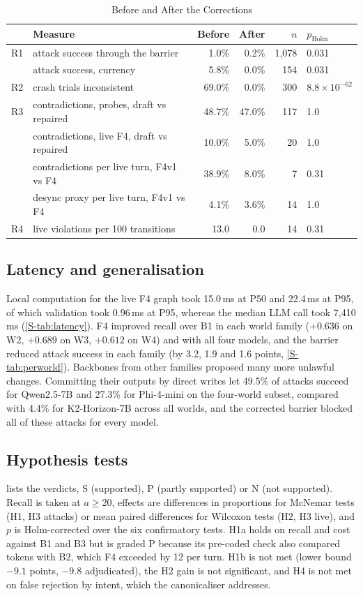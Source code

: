 \documentclass[letterpaper,journal]{IEEEtran}
\begin{document}
\begin{table}[!htbp]
\centering\scriptsize
\setlength{\tabcolsep}{2.5pt}
\caption{Before and After the Corrections}
\label{tab:before-after}
\begin{tabularx}{\linewidth}{@{}l L r r r l@{}}
\toprule
 & Measure & Before & After & $n$ & $p_{\text{Holm}}$ \\
\midrule
R1 & attack success through the barrier & 1.0\% & 0.2\% & 1{,}078 & 0.031 \\
 & attack success, currency & 5.8\% & 0.0\% & 154 & 0.031 \\
R2 & crash trials inconsistent & 69.0\% & 0.0\% & 300 & $8.8\times10^{-62}$ \\
R3 & contradictions, probes, draft vs repaired & 48.7\% & 47.0\% & 117 & 1.0 \\
 & contradictions, live F4, draft vs repaired & 10.0\% & 5.0\% & 20 & 1.0 \\
 & contradictions per live turn, F4v1 vs F4 & 38.9\% & 8.0\% & 7 & 0.31 \\
 & desync proxy per live turn, F4v1 vs F4 & 4.1\% & 3.6\% & 14 & 1.0 \\
R4 & live violations per 100 transitions & 13.0 & 0.0 & 14 & 0.31 \\
\bottomrule
\end{tabularx}
\end{table}

\subsection{Latency and generalisation}\label{sec:general}
Local computation for the live F4 graph took 15.0\,ms at P50 and 22.4\,ms at P95, of which validation took 0.96\,ms at P95, whereas the median LLM call took 7{,}410\,ms (\cref{S-tab:latency}). F4 improved recall over B1 in each world family ($+0.636$ on W2, $+0.689$ on W3, $+0.612$ on W4) and with all four models, and the barrier reduced attack success in each family (by 3.2, 1.9 and 1.6 points, \cref{S-tab:perworld}). Backbones from other families proposed many more unlawful changes. Committing their outputs by direct writes let 49.5\% of attacks succeed for Qwen2.5-7B and 27.3\% for Phi-4-mini on the four-world subset, compared with 4.4\% for K2-Horizon-7B across all worlds, and the corrected barrier blocked all of these attacks for every model.

\subsection{Hypothesis tests}\label{sec:hyptests}
 lists the verdicts, S (supported), P (partly supported) or N (not supported). Recall is taken at $a\ge20$, effects are differences in proportions for McNemar tests (H1, H3 attacks) or mean paired differences for Wilcoxon tests (H2, H3 live), and $p$ is Holm-corrected over the six confirmatory tests. H1a holds on recall and cost against B1 and B3 but is graded P because its pre-coded check also compared tokens with B2, which F4 exceeded by 12 per turn. H1b is not met (lower bound $-9.1$ points, $-9.8$ adjudicated), the H2 gain is not significant, and H4 is not met on false rejection by intent, which the canonicaliser addresses.
\end{document}
